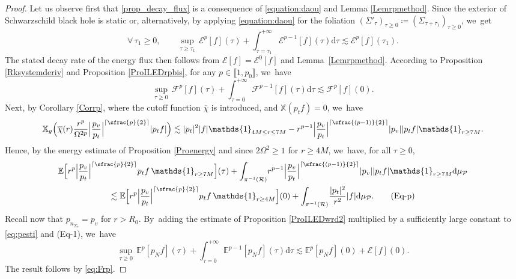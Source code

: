 \documentclass[10pt]{amsart}
\newcommand{\psfrac}[2]{\sfrac{(#1)}{#2}}
\theoremstyle{plain}
\theoremstyle{definition}
\newcommand\T{{\mathbb{X}}}
\newcommand\dr{{\mathrm{d}}}
\begin{document}
\begin{proof}
Let us observe first that \eqref{prop_decay_flux} is a consequence of \eqref{equation:daou} and Lemma \ref{Lemrpmethod}. Since the exterior of Schwarzschild black hole is static or, alternatively, by applying \eqref{equation:daou} for the foliation $(\Sigma'_\tau)_{\tau \geq 0}\coloneqq(\Sigma_{\tau+\tau_1})_{\tau \geq 0}$, we~get\vspace*{-3pt}
\[
\forall \, \tau_1 \geq 0, \qquad \sup_{\tau \geq \tau_1} \, \mathcal{E}^p[f](\tau) + \int_{\tau=\tau_1}^{+\infty} \mathcal{E}^{p-1}[f](\tau) \dr \tau \lesssim \mathcal{E}^p[f](\tau_1).
\]
The stated decay rate of the energy flux then follows from $\mathcal{E}[f]=\mathcal{E}^0[f]$ and Lem\-ma~\ref{Lemrpmethod}.
According to Proposition \ref{Rksystemderiv} and Proposition \ref{ProILEDrpbis}, for any $p \in \llbracket 1,p_0 \rrbracket$, we~have\vspace*{-3pt}
\begin{equation}\label{eq:Frp}
\sup_{\tau \geq 0}\, \mathcal{F}^p[f](\tau) + \int_{\tau =0}^{+\infty} \mathcal{F}^{p-1}[f](\tau) \dr \tau \lesssim \mathcal{F}^p[f](0).
\end{equation}
Next, by Corollary \ref{Corrp}, where the cutoff function $\overline{\chi}$ is introduced, and $\T(p_t f)=0$, we~have\vspace*{-4pt}
\[
\T_g \Bigl(\overline{\chi}(r) \frac{r^{p}}{\Omega^{2p}} \Big|\frac{p_v}{p_t}\Big|^{\lceil \sfrac{p}{2} \rceil} | p_t f | \Bigr) \lesssim |p_t|^2| f| \mathds{1}_{4M \leq r \leq 7M}- r^{p-1} \Big|\frac{p_v}{p_t}\Big|^{\lceil \psfrac{p-1}{2} \rceil}|p_v||p_t f| \mathds{1}_{r \geq 7M}.
\]
Hence, by the energy estimate of Proposition \ref{Proenergy} and since $2\Omega^2 \geq 1$ for $ r \geq 4M$, we~have, for all $\tau \geq 0$,\vspace*{-4pt}
\begin{multline}
\mathbb{E} \Bigl[ r^{p} \Big|\frac{p_v}{p_t}\Big|^{\lceil \sfrac{p}{2} \rceil} p_t f \, \mathds{1}_{r \geq 7M} \Bigr] (\tau)+\int_{\pi^{-1}(\mathcal{R})} \! r^{p-1} \Big|\frac{p_v}{p_t}\Big|^{\lceil \psfrac{p-1}{2} \rceil}|p_v||p_t f| \mathds{1}_{r \geq 7M} \dr \mu_{\mathcal{P}} \\
\lesssim \mathbb{E} \Bigl[ r^{p} \Big|\frac{p_v}{p_t}\Big|^{\lceil \sfrac{p}{2} \rceil} p_t f \, \mathds{1}_{r \geq 4M} \Bigr] (0)+\int_{\pi^{-1}(\mathcal{R})} \! \frac{ |p_t|^2}{r^2} |f| \dr \mu_{\mathcal{P}}. \label{eq:pesti} \tag{Eq-p}
\end{multline}
Recall now that $p_{n_{\Sigma_\tau}} = p_v$ for $r >R_0$. By~adding the estimate of Proposition \ref{ProILEDwrd2} multiplied by a sufficiently large constant to \eqref{eq:pesti} and (Eq-1), we~have\vspace*{-3pt}
\[
\sup_{\tau \geq 0}\,\mathbb{E}^p [p_N f](\tau) +\int_{\tau =0}^{+\infty} \mathbb{E}^{p-1} [p_N f](\tau) \dr \tau \lesssim \mathbb{E}^p [p_N f](0)+\mathcal{E}[f](0).
\]
The result follows by \eqref{eq:Frp}.
\end{proof}
\end{document}
